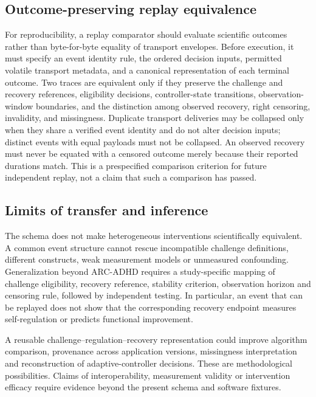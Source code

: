\subsection{Outcome-preserving replay equivalence}
For reproducibility, a replay comparator should evaluate scientific outcomes rather than byte-for-byte equality of transport envelopes. Before execution, it must specify an event identity rule, the ordered decision inputs, permitted volatile transport metadata, and a canonical representation of each terminal outcome. Two traces are equivalent only if they preserve the challenge and recovery references, eligibility decisions, controller-state transitions, observation-window boundaries, and the distinction among observed recovery, right censoring, invalidity, and missingness. Duplicate transport deliveries may be collapsed only when they share a verified event identity and do not alter decision inputs; distinct events with equal payloads must not be collapsed. An observed recovery must never be equated with a censored outcome merely because their reported durations match. This is a prespecified comparison criterion for future independent replay, not a claim that such a comparison has passed.

\subsection{Limits of transfer and inference}

The schema does not make heterogeneous interventions scientifically equivalent. A common event structure cannot rescue incompatible challenge definitions, different constructs, weak measurement models or unmeasured confounding. Generalization beyond ARC-ADHD requires a study-specific mapping of challenge eligibility, recovery reference, stability criterion, observation horizon and censoring rule, followed by independent testing. In particular, an event that can be replayed does not show that the corresponding recovery endpoint measures self-regulation or predicts functional improvement.

A reusable challenge--regulation--recovery representation could improve algorithm comparison, provenance across application versions, missingness interpretation and reconstruction of adaptive-controller decisions. These are methodological possibilities. Claims of interoperability, measurement validity or intervention efficacy require evidence beyond the present schema and software fixtures.
